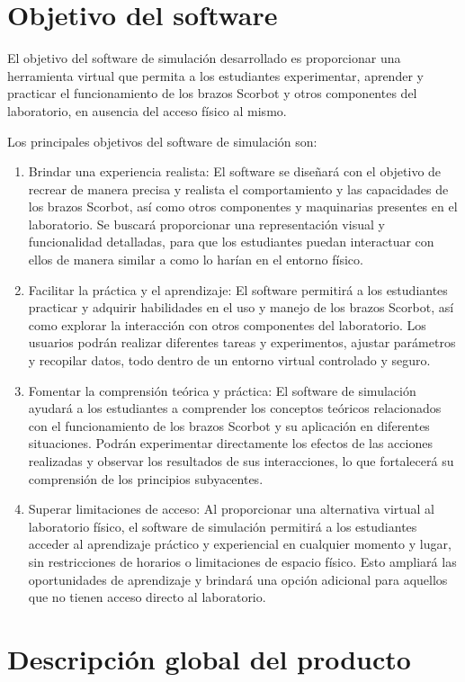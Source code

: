 \section{Objetivo del software}
El objetivo del software de simulación desarrollado es proporcionar una herramienta virtual que permita a los estudiantes experimentar, aprender y practicar el funcionamiento de los brazos Scorbot y otros componentes del laboratorio, en ausencia del acceso físico al mismo.

Los principales objetivos del software de simulación son:
\begin{enumerate}[label=\arabic*.-]
\item Brindar una experiencia realista: El software se diseñará con el objetivo de recrear de manera precisa y realista el comportamiento y las capacidades de los brazos Scorbot, así como otros componentes y maquinarias presentes en el laboratorio. Se buscará proporcionar una representación visual y funcionalidad detalladas, para que los estudiantes puedan interactuar con ellos de manera similar a como lo harían en el entorno físico.
\item Facilitar la práctica y el aprendizaje: El software permitirá a los estudiantes practicar y adquirir habilidades en el uso y manejo de los brazos Scorbot, así como explorar la interacción con otros componentes del laboratorio. Los usuarios podrán realizar diferentes tareas y experimentos, ajustar parámetros y recopilar datos, todo dentro de un entorno virtual controlado y seguro.
\item Fomentar la comprensión teórica y práctica: El software de simulación ayudará a los estudiantes a comprender los conceptos teóricos relacionados con el funcionamiento de los brazos Scorbot y su aplicación en diferentes situaciones. Podrán experimentar directamente los efectos de las acciones realizadas y observar los resultados de sus interacciones, lo que fortalecerá su comprensión de los principios subyacentes.
\item Superar limitaciones de acceso: Al proporcionar una alternativa virtual al laboratorio físico, el software de simulación permitirá a los estudiantes acceder al aprendizaje práctico y experiencial en cualquier momento y lugar, sin restricciones de horarios o limitaciones de espacio físico. Esto ampliará las oportunidades de aprendizaje y brindará una opción adicional para aquellos que no tienen acceso directo al laboratorio.
\end{enumerate}
\section{Descripción global del producto}
